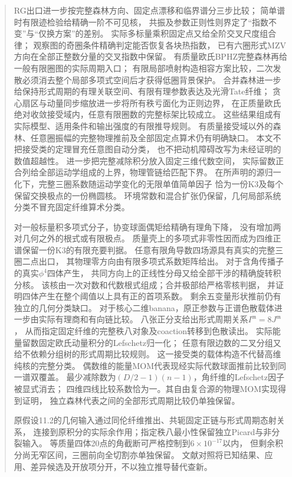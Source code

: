 \documentclass[11pt,a4paper]{ctexart}
\theoremstyle{cnplain}\newtheorem{theorem}{定理}[section]
\theoremstyle{definition}\newtheorem{definition}[theorem]{定义}
\theoremstyle{remark}\newtheorem{remark}[theorem]{注}
\begin{document}
\begin{abstract}
RG出口进一步按完整森林方向、固定点漂移和临界谱分三步比较；
简单谱时有限迹检验给精确一阶不可见核，
共振及参数正则性则界定了“指数不变”与“仅换方案”的差别。
实际多标量乘积固定点又给全阶交叉尺度组合律；
观察图的奇圈条件精确判定能否恢复各块热指数，
已有六圈形式MZV方向在全部正整数分量的交叉指数中保留。
有质量欧氏BPHZ完整森林再给一般有限圈图的实际周期入口；
有限局部喷射构造相容方案比较，二次发散必须消去整个局部多项式空间后才获得低圈背景保护。
合并森林进一步给保持形式周期的有理关联空间、有限有理参数表达及光滑Tate纤维；
贪心扇区与动量同步缩放进一步将所有秩亏面化为正则边界，
在正质量欧氏绝对收敛接受域内，任意有限圈数的完整标架比较成立。
这些结果组成有实际模型、适用条件和输出强度的有限推导规则。
有质量接受域以外的森林、任意圈振幅的完整物理推前及全部固定点算术仍有明确缺口。
本文不把接受类的定理冒充任意图自动分类，
也不把动机障碍改写为未经证明的数值超越性。
进一步把完整减除积分放入固定三维代数空间，
实际留数正合列给全部运动学组成的上界，物理管链给匹配下界。
在所声明的源归一化下，完整三圈系数随运动学变化的无限单值简单因子
恰为一份K3及每个保留交换极点的一份椭圆核。
环境常数和混合扩张仍保留，几何局部系统分类不冒充固定纤维算术分类。

对一般标量积多项式分子，协变球面偶矩给精确有理角下降，
没有增加两对几何之外的根式或有限极点。
质量壳上的多项式非零性因而成为四维正谱保留一份K3的有限充要判据。
任意有限角导数四场源具有真实的完整三圈二点出口，
其物理零方向由有限多项式系数矩阵给出。
对于含角传播子的真实$\phi^4$四体产生，
共同方向上的正线性分母又给全部干涉的精确旋转积分核。
该核由一次对数和代数根式组成；合并极部给严格零核判据，
并证明四体产生在整个阈值以上具有正的首项系数。
剩余五变量形状推前仍有独立的几何分类缺口。
对于核心二维banana，原正参数与正谱色散载体进一步由实际有理商和有向链比较。
八张正分支给出形式周期关系$I^{\mathfrak m}=8J^{\mathfrak m}$，
从而指定固定纤维的完整秩八对象及coaction转移到色散读出。
实际能量留数固定欧氏动量积分的Lefschetz归一化；
任意有限边数的二叉分组又给不依赖分组树的形式周期比较规则。
这一接受类的载体构造不代替高维纯核的完整分类。
偶数维的能量MOM代表现经实际代数球面推前比较到同一谱双覆盖。
最少减除数为$(D/2-1)(n-1)$，角纤维的Lefschetz因子被显式消去；
四维四线比较系数恰为一。其自由复合源的物理MOM实现得到证明，
独立森林代表之间的全部形式周期比较仍单独保留。


原假设11.2的几何输入通过同伦纤维推出、共轭固定正链与形式周期态射关系，
连接到原积分的实际余作用；指定秩八最小性保留独立Picard与非分裂输入。
等质量四体20点的角截断可严格控制到$6\times10^{-17}$以内，
但剩余积分尚无窄区间，三圈前向全切割亦单独保留。
文献对照将已知结果、应用、差异候选及开放项分开，不以独立推导替代查新。

\end{abstract}
\tableofcontents
\end{document}
